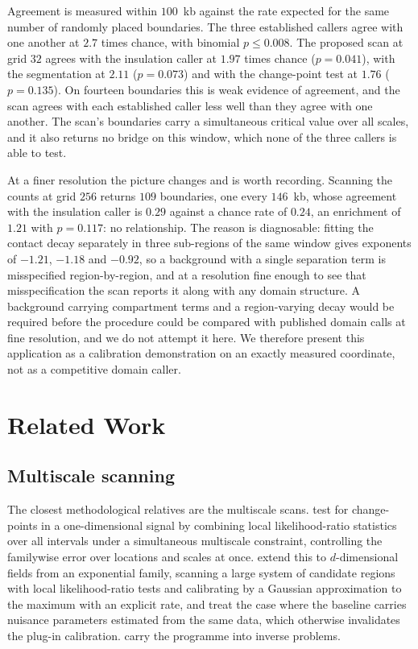 \documentclass[11pt]{article}
\theoremstyle{definition}
\newcommand{\1}{\mathbf 1}\newcommand{\op}{\operatorname}
\begin{document}
Agreement is measured within $100$~kb against the rate expected for the same
number of randomly placed boundaries.  The three established callers agree
with one another at $2.7$ times chance, with binomial $p\le0.008$.  The
proposed scan at grid $32$ agrees with the insulation caller at $1.97$ times
chance ($p=0.041$), with the segmentation at $2.11$ ($p=0.073$) and with the
change-point test at $1.76$ ($p=0.135$).  On fourteen boundaries this is
weak evidence of agreement, and the scan agrees with each established caller
less well than they agree with one another.  The scan's boundaries carry a
simultaneous critical value over all scales, and it also returns no bridge on
this window, which none of the three callers is able to test.

At a finer resolution the picture changes and is worth recording.  Scanning the
counts at grid $256$ returns $109$ boundaries, one every $146$~kb, whose
agreement with the insulation caller is $0.29$ against a chance rate of $0.24$,
an enrichment of $1.21$ with $p=0.117$: no relationship.  The reason is
diagnosable: fitting the contact decay separately in three
sub-regions of the same window gives exponents of $-1.21$, $-1.18$ and
$-0.92$, so a background with a single separation term is misspecified
region-by-region, and at a resolution fine enough to see that misspecification
the scan reports it along with any domain structure.  A background carrying
compartment terms and a region-varying decay would be required before the
procedure could be compared with published domain calls at fine resolution,
and we do not attempt it here.  We therefore present this application as a
calibration demonstration on an exactly measured coordinate, not as a
competitive domain caller.



\section{Related Work}                          \label{sec:related}

\subsection{Multiscale scanning}

The closest methodological relatives are the multiscale scans.
\citet{frick2014} test for change-points in a one-dimensional signal by
combining local likelihood-ratio statistics over all intervals under a
simultaneous multiscale constraint, controlling the familywise error over
locations and scales at once.  \citet{koenig2020} extend this to
$d$-dimensional fields from an exponential family, scanning a large system of
candidate regions with local likelihood-ratio tests and calibrating by a
Gaussian approximation to the maximum with an explicit rate, and
\citet{koenigJRSSB} treat the case where the baseline carries nuisance
parameters estimated from the same data, which otherwise invalidates the
plug-in calibration.  \citet{proksch2018} carry the programme into inverse
problems.
\end{document}
